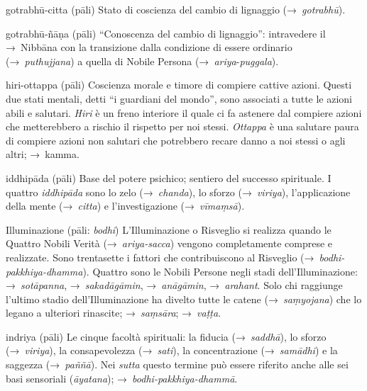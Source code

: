 \begin{glossarydescription}
\item[gotrabhū-citta] (pāli) Stato di coscienza del cambio di lignaggio
  (→~\emph{gotrabhū}).

\item[gotrabhū-ñāṇa] (pāli) ``Conoscenza del cambio di lignaggio'': intravedere
  il →~Nibbāna con la transizione dalla condizione di essere ordinario
  (→~\emph{puthujjana}) a quella di Nobile Persona
  (→~\emph{ariya}-\emph{puggala}).


\item[hiri-ottappa] (pāli) Coscienza morale e timore di compiere cattive azioni.
  Questi due stati mentali, detti ``i guardiani del mondo'', sono associati a
  tutte le azioni abili e salutari. \emph{Hiri} è un freno interiore il quale ci
  fa astenere dal compiere azioni che metterebbero a rischio il rispetto per noi
  stessi. \emph{Ottappa} è una salutare paura di compiere azioni non salutari
  che potrebbero recare danno a noi stessi o agli altri; →~kamma.


\item[iddhipāda] (pāli)\label{glossary-iddhipada} Base del potere psichico; sentiero del
  successo spirituale. I quattro \emph{iddhipāda} sono lo zelo
  (→~\emph{chanda}), lo sforzo (→~\emph{viriya}), l'applicazione della mente
  (→~\emph{citta}) e l'investigazione (→~\emph{vīmaṃsā}).

\item[Illuminazione] (pāli: \emph{bodhi}) L'Illuminazione o Risveglio si
  realizza quando le Quattro Nobili Verità (→~\emph{ariya-sacca}) vengono
  completamente comprese e realizzate. Sono trentasette i fattori che
  contribuiscono al Risveglio (→~\emph{bodhi-pakkhiya-dhamma}). Quattro sono le
  Nobili Persone negli stadi dell'Illuminazione: →~\emph{sotāpanna},
  →~\emph{sakadāgāmin}, →~\emph{anāgāmin}, →~\emph{arahant}. Solo chi raggiunge
  l'ultimo stadio dell'Illuminazione ha divelto tutte le catene
  (→~\emph{saṃyojana}) che lo legano a ulteriori rinascite; →~\emph{saṃsāra};
  →~\emph{vaṭṭa}.

\item[indriya] (pāli) Le cinque facoltà spirituali: la fiducia
  (→~\emph{saddhā}), lo sforzo (→~\emph{viriya}), la consapevolezza
  (→~\emph{sati}), la concentrazione (→~\emph{samādhi}) e la saggezza
  (→~\emph{paññā}). Nei \emph{sutta} questo termine può essere riferito anche
  alle sei basi sensoriali (\emph{āyatana}); →~\emph{bodhi-pakkhiya-dhammā}.


\end{glossarydescription}
